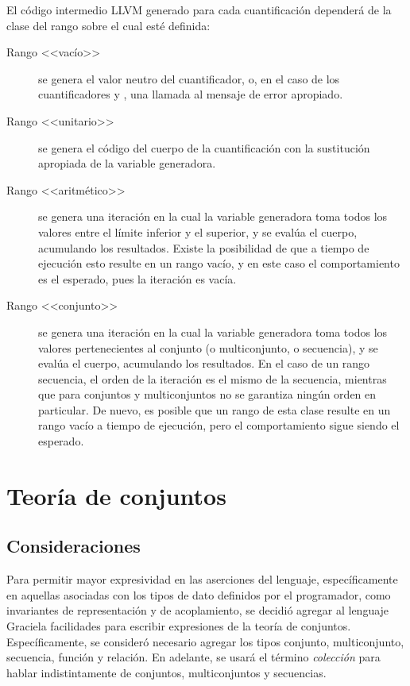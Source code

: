 {{El código intermedio LLVM generado para cada cuantificación dependerá de la
clase del rango sobre el cual esté definida:

\begin{description}

  \item [Rango <<vacío>>] se genera el valor neutro del cuantificador, o, en el
caso de los cuantificadores  y , una llamada al mensaje
de error apropiado.

  \item [Rango <<unitario>>] se genera el código del cuerpo de la cuantificación
con la sustitución apropiada de la variable generadora.

  \item [Rango <<aritmético>>] se genera una iteración en la cual la variable
generadora toma todos los valores entre el límite inferior y el superior, y se
evalúa el cuerpo, acumulando los resultados. Existe la posibilidad de que a
tiempo de ejecución esto resulte en un rango vacío, y en este caso el
comportamiento es el esperado, pues la iteración es vacía.

  \item [Rango <<conjunto>>] se genera una iteración en la cual la variable
generadora toma todos los valores pertenecientes al conjunto (o multiconjunto,
o secuencia), y se evalúa el cuerpo, acumulando los resultados. En el caso de un
rango secuencia, el orden de la iteración es el mismo de la secuencia, mientras
que para conjuntos y multiconjuntos no se garantiza ningún orden en particular.
De nuevo, es posible que un rango de esta clase resulte en un rango vacío a
tiempo de ejecución, pero el comportamiento sigue siendo el esperado.

\end{description}


\section{Teoría de conjuntos}\label{sect:sets}
\subsection{Consideraciones}

Para permitir mayor expresividad en las aserciones del lenguaje, específicamente
en aquellas asociadas con los tipos de dato definidos por el programador, como
invariantes de representación y de acoplamiento, se decidió agregar al lenguaje
Graciela facilidades para escribir expresiones de la teoría de conjuntos.
Específicamente, se consideró necesario agregar los tipos conjunto,
multiconjunto, secuencia, función y relación. En adelante, se usará el término
\textit{colección} para hablar indistintamente de conjuntos, multiconjuntos y
secuencias.

}}
